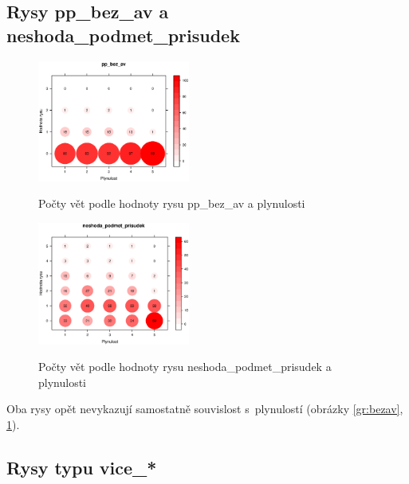 \documentclass[12pt,a4paper]{report}
\begin{document}
\subsection{Rysy pp\_bez\_av a neshoda\_podmet\_prisudek}
\begin{figure}[!htb]
\begin{center}
  \centering\includegraphics[width=50mm]{./grafy/rysy/pp_bez_av-c.eps}
  \caption{Počty vět podle hodnoty rysu pp\_bez\_av a plynulosti}\label{gr:bezav}
\endminipage\quad
{}
  \centering\includegraphics[width=50mm]{./grafy/rysy/neshoda_podmet_prisudek-c.eps}
  \caption{Počty vět podle hodnoty rysu neshoda\_podmet\_prisudek a plynulosti}\label{gr:neshoda}
\endminipage
\end{center}
\end{figure}

Oba rysy opět nevykazují samostatně souvislost s~plynulostí (obrázky \ref{gr:bezav}, \ref{gr:neshoda}). 


\subsection{Rysy typu vice\_*}
\end{document}
